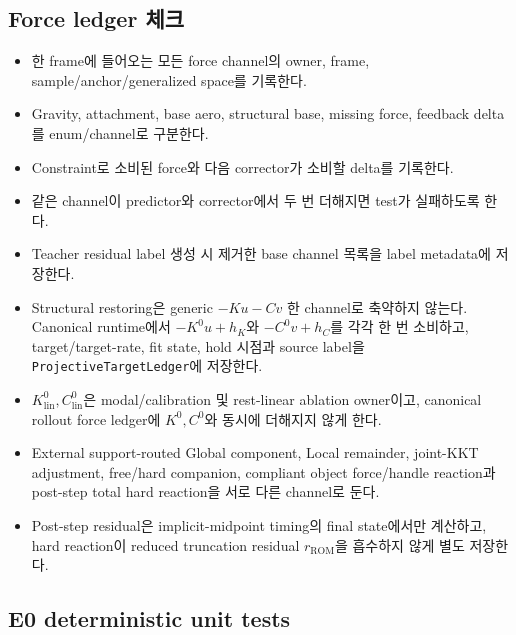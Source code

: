 \documentclass[10pt,a4paper]{article}
\newcommand{\todo}{\textcolor{TodoGray}{\(\square\)}}
\newcommand{\code}[1]{\texttt{#1}}
\begin{document}
\subsection*{Force ledger 체크}

\begin{itemize}
  \item[\todo] 한 frame에 들어오는 모든 force channel의 owner, frame, sample/anchor/generalized space를 기록한다.
  \item[\todo] Gravity, attachment, base aero, structural base, missing force, feedback delta를 enum/channel로 구분한다.
  \item[\todo] Constraint로 소비된 force와 다음 corrector가 소비할 delta를 기록한다.
  \item[\todo] 같은 channel이 predictor와 corrector에서 두 번 더해지면 test가 실패하도록 한다.
  \item[\todo] Teacher residual label 생성 시 제거한 base channel 목록을 label metadata에 저장한다.
  \item[\todo] Structural restoring은 generic \(-Ku-Cv\) 한 channel로 축약하지 않는다.
  Canonical runtime에서 \(-K^0u+h_K\)와 \(-C^0v+h_C\)를 각각 한 번 소비하고,
  target/target-rate, fit state, hold 시점과 source label을 \code{ProjectiveTargetLedger}에 저장한다.
  \item[\todo] \(K_{\mathrm{lin}}^0,C_{\mathrm{lin}}^0\)은 modal/calibration 및 rest-linear ablation owner이고,
  canonical rollout force ledger에 \(K^0,C^0\)와 동시에 더해지지 않게 한다.
  \item[\todo] External support-routed Global component, Local remainder, joint-KKT adjustment,
  free/hard companion, compliant object force/handle reaction과 post-step total hard reaction을 서로 다른 channel로 둔다.
  \item[\todo] Post-step residual은 implicit-midpoint timing의 final state에서만 계산하고,
  hard reaction이 reduced truncation residual \(r_{\mathrm{ROM}}\)을 흡수하지 않게 별도 저장한다.
\end{itemize}

\subsection*{E0 deterministic unit tests}
\end{document}
